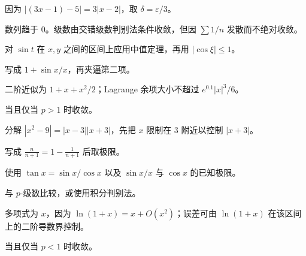 \begin{selectedhints}
    \item 因为 $|(3x-1)-5|=3|x-2|$，取 $\delta=\varepsilon/3$。
    \item 数列趋于 $0$。级数由交错级数判别法条件收敛，但因 $\sum1/n$ 发散而不绝对收敛。
    \item 对 $\sin t$ 在 $x,y$ 之间的区间上应用中值定理，再用 $|\cos\xi|\le1$。
    \item 写成 $1+\sin x/x$，再夹逼第二项。
    \item 二阶近似为 $1+x+x^2/2$；Lagrange 余项大小不超过 $e^{0.1}|x|^3/6$。
    \item 当且仅当 $p>1$ 时收敛。
    \item 分解 $|x^2-9|=|x-3||x+3|$，先把 $x$ 限制在 $3$ 附近以控制 $|x+3|$。
    \item 写成 $\frac{n}{n+1}=1-\frac{1}{n+1}$ 后取极限。
    \item 使用 $\tan x=\sin x/\cos x$ 以及 $\sin x/x$ 与 $\cos x$ 的已知极限。
    \item 与 $p$-级数比较，或使用积分判别法。
    \item 多项式为 $x$，因为 $\ln(1+x)=x+O(x^2)$；误差可由 $\ln(1+x)$ 在该区间上的二阶导数界控制。
    \item 当且仅当 $p<1$ 时收敛。
\end{selectedhints}
